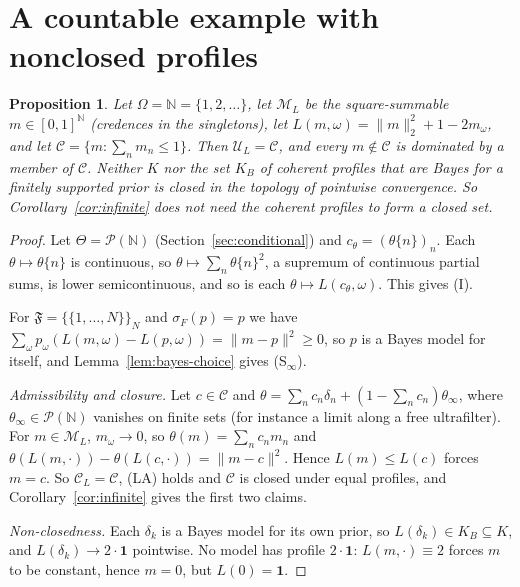 \documentclass[11pt]{article}
\newtheorem{proposition}[theorem]{Proposition}
\theoremstyle{definition}
\theoremstyle{remark}
\newcommand{\M}{\mathcal M}
\newcommand{\C}{\mathcal C}
\newcommand{\F}{\mathfrak F}
\newcommand{\U}{\mathcal U}
\newcommand{\PP}{\mathcal P}
\newcommand{\one}{\mathbf 1}
\begin{document}
\section{A countable example with nonclosed profiles}\label{sec:countable}
\begin{proposition}\label{prop:countable}
Let $\Omega=\mathbb N=\{1,2,\dots\}$, let $\M_L$ be the square-summable $m\in[0,1]^{\mathbb N}$ (credences in the singletons), let $L(m,\omega)=\|m\|_2^2+1-2m_\omega$, and let $\C=\{m:\sum_nm_n\le1\}$. Then $\U_L=\C$, and every $m\notin\C$ is dominated by a member of $\C$. Neither $K$ nor the set $K_B$ of coherent profiles that are Bayes for a finitely supported prior is closed in the topology of pointwise convergence. So Corollary~\ref{cor:infinite} does not need the coherent profiles to form a closed set.
\end{proposition}
\begin{proof}
Let $\Theta=\PP(\mathbb N)$ (Section~\ref{sec:conditional}) and $c_\theta=(\theta\{n\})_n$. Each $\theta\mapsto\theta\{n\}$ is continuous, so $\theta\mapsto\sum_n\theta\{n\}^2$, a supremum of continuous partial sums, is lower semicontinuous, and so is each $\theta\mapsto L(c_\theta,\omega)$. This gives (I).

For $\F=\{\{1,\dots,N\}\}_N$ and $\sigma_F(p)=p$ we have $\sum_\omega p_\omega(L(m,\omega)-L(p,\omega))=\|m-p\|^2\ge0$, so $p$ is a Bayes model for itself, and Lemma~\ref{lem:bayes-choice} gives (S$_\infty$).

\emph{Admissibility and closure.} Let $c\in\C$ and $\theta=\sum_nc_n\delta_n+(1-\sum_nc_n)\theta_\infty$, where $\theta_\infty\in\PP(\mathbb N)$ vanishes on finite sets (for instance a limit along a free ultrafilter). For $m\in\M_L$, $m_\omega\to0$, so $\theta(m)=\sum_nc_nm_n$ and $\theta(L(m,\cdot))-\theta(L(c,\cdot))=\|m-c\|^2$. Hence $L(m)\le L(c)$ forces $m=c$. So $\C_L=\C$, (LA) holds and $\C$ is closed under equal profiles, and Corollary~\ref{cor:infinite} gives the first two claims.

\emph{Non-closedness.} Each $\delta_k$ is a Bayes model for its own prior, so $L(\delta_k)\in K_B\subseteq K$, and $L(\delta_k)\to2\cdot\one$ pointwise. No model has profile $2\cdot\one$: $L(m,\cdot)\equiv2$ forces $m$ to be constant, hence $m=0$, but $L(0)=\one$.
\end{proof}
\end{document}
